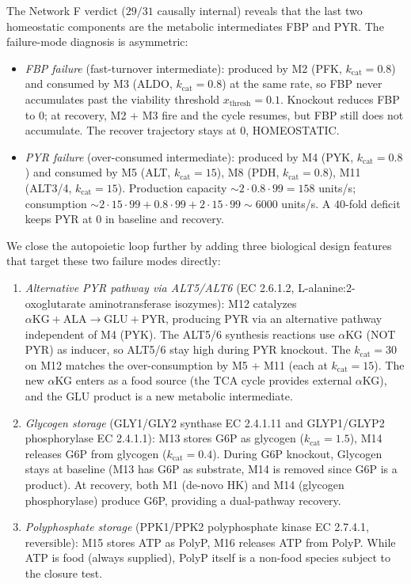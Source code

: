 \documentclass[11pt,a4paper]{article}
\theoremstyle{plain}
\theoremstyle{definition}
\theoremstyle{remark}
\begin{document}
The Network F verdict ($29/31$ causally internal) reveals that the
last two homeostatic components are the metabolic intermediates FBP and
PYR. The failure-mode diagnosis is asymmetric:
\begin{itemize}[leftmargin=*, itemsep=2pt]
\item \emph{FBP failure} (fast-turnover intermediate): produced by M2
(PFK, $k_{\mathrm{cat}} = 0.8$) and consumed by M3 (ALDO,
$k_{\mathrm{cat}} = 0.8$) at the same rate, so FBP never accumulates
past the viability threshold $x_{\mathrm{thresh}} = 0.1$. Knockout
reduces FBP to $0$; at recovery, M2 + M3 fire and the cycle resumes,
but FBP still does not accumulate. The recover trajectory stays at
$0$, HOMEOSTATIC.
\item \emph{PYR failure} (over-consumed intermediate): produced by M4
(PYK, $k_{\mathrm{cat}} = 0.8$) and consumed by M5 (ALT,
$k_{\mathrm{cat}} = 15$), M8 (PDH, $k_{\mathrm{cat}} = 0.8$), M11 (ALT3/4,
$k_{\mathrm{cat}} = 15$). Production capacity $\sim 2 \cdot 0.8 \cdot
99 = 158$ units/s; consumption $\sim 2 \cdot 15 \cdot 99 + 0.8 \cdot
99 + 2 \cdot 15 \cdot 99 \sim 6000$ units/s. A $40$-fold deficit
keeps PYR at $0$ in baseline and recovery.
\end{itemize}
We close the autopoietic loop further by adding three biological design
features that target these two failure modes directly:
\begin{enumerate}[leftmargin=*, itemsep=2pt]
\item \emph{Alternative PYR pathway via ALT5/ALT6} (EC 2.6.1.2,
L-alanine:2-oxoglutarate aminotransferase isozymes): M12 catalyzes
$\alpha\mathrm{KG} + \mathrm{ALA} \to \mathrm{GLU} + \mathrm{PYR}$,
producing PYR via an alternative pathway independent of M4 (PYK).
The ALT5/6 synthesis reactions use $\alpha$KG (NOT PYR) as inducer,
so ALT5/6 stay high during PYR knockout. The $k_{\mathrm{cat}} = 30$
on M12 matches the over-consumption by M5 + M11 (each at
$k_{\mathrm{cat}} = 15$). The new $\alpha$KG enters as a food source
(the TCA cycle provides external $\alpha$KG), and the GLU product is
a new metabolic intermediate.
\item \emph{Glycogen storage} (GLY1/GLY2 synthase EC 2.4.1.11 and
GLYP1/GLYP2 phosphorylase EC 2.4.1.1): M13 stores G6P as glycogen
($k_{\mathrm{cat}} = 1.5$), M14 releases G6P from glycogen
($k_{\mathrm{cat}} = 0.4$). During G6P knockout, Glycogen stays at
baseline (M13 has G6P as substrate, M14 is removed since G6P is a
product). At recovery, both M1 (de-novo HK) and M14 (glycogen
phosphorylase) produce G6P, providing a dual-pathway recovery.
\item \emph{Polyphosphate storage} (PPK1/PPK2 polyphosphate kinase EC
2.7.4.1, reversible): M15 stores ATP as PolyP, M16 releases ATP from
PolyP. While ATP is food (always supplied), PolyP itself is a
non-food species subject to the closure test.
\end{enumerate}
\end{document}
